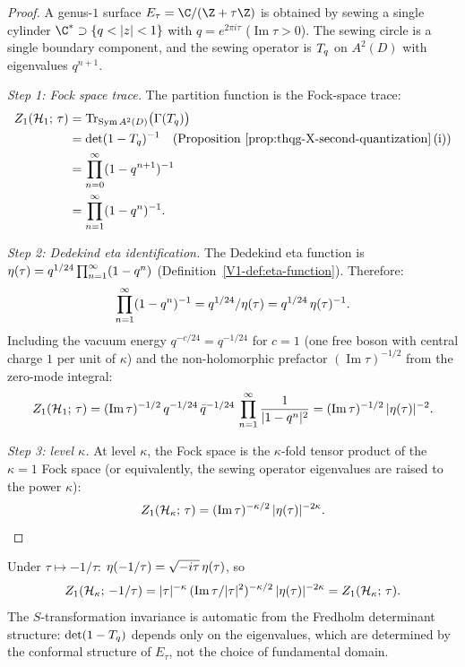 \begin{proof}
A genus-$1$ surface $E_\tau = \C/(\Z + \tau\Z)$ is obtained
by sewing a single cylinder $\C^* \supset
\{q < |z| < 1\}$ with $q = e^{2\pi i \tau}$ ($\operatorname{Im}\tau > 0$).
The sewing circle is a single boundary component, and the
sewing operator is $T_q$ on $A^2(D)$ with eigenvalues
$q^{n+1}$.

\emph{Step 1: Fock space trace.}
The partition function is the Fock-space trace:
\begin{align}
Z_1(\mathcal{H}_1;\,\tau)
&= \operatorname{Tr}_{\operatorname{Sym} A^2(D)}
\bigl(\Gamma(T_q)\bigr)
\notag\\
&= \det(1 - T_q)^{-1}
\quad\text{(Proposition~\ref{prop:thqg-X-second-quantization}\,(i))}
\notag\\
&= \prod_{n=0}^{\infty}
(1 - q^{n+1})^{-1}
\notag\\
&= \prod_{n=1}^{\infty}
(1 - q^n)^{-1}.
\end{align}

\emph{Step 2: Dedekind eta identification.}
The Dedekind eta function is
$\eta(\tau) = q^{1/24}\prod_{n=1}^{\infty}(1-q^n)$
(Definition~\ref{V1-def:eta-function}). Therefore:
\begin{equation}%
\prod_{n=1}^{\infty}(1-q^n)^{-1}
= q^{1/24} / \dedeta(\tau)
= q^{1/24}\,\dedeta(\tau)^{-1}.
\end{equation}
Including the vacuum energy $q^{-c/24} = q^{-1/24}$ for
$c = 1$ (one free boson with central charge $1$ per unit of
$\kappa$) and the non-holomorphic prefactor
$(\operatorname{Im}\tau)^{-1/2}$ from the zero-mode
integral:
\[
Z_1(\mathcal{H}_1;\,\tau)
= (\operatorname{Im}\tau)^{-1/2}\,
q^{-1/24}\,\bar{q}^{-1/24}\,
\prod_{n=1}^{\infty}
\frac{1}{|1-q^n|^2}
= (\operatorname{Im}\tau)^{-1/2}\,
|\eta(\tau)|^{-2}.
\]

\emph{Step 3: level $\kappa$.}
At level $\kappa$, the Fock space is the $\kappa$-fold tensor
product of the $\kappa = 1$ Fock space (or equivalently, the
sewing operator eigenvalues are raised to the power $\kappa$):
\[
Z_1(\mathcal{H}_\kappa;\,\tau)
= (\operatorname{Im}\tau)^{-\kappa/2}\,
|\eta(\tau)|^{-2\kappa}.
\qedhere
\]
\end{proof}

\begin{remark}%
Under $\tau \mapsto -1/\tau$:
$\eta(-1/\tau) = \sqrt{-i\tau}\,\eta(\tau)$, so
\[
Z_1(\mathcal{H}_\kappa;\,-1/\tau)
= |\tau|^{-\kappa}\,
(\operatorname{Im}\tau/|\tau|^2)^{-\kappa/2}\,
|\eta(\tau)|^{-2\kappa}
= Z_1(\mathcal{H}_\kappa;\,\tau).
\]
The $S$-transformation invariance is automatic from the
Fredholm determinant structure: $\det(1 - T_q)$ depends
only on the eigenvalues, which are determined by the conformal
structure of $E_\tau$, not the choice of fundamental domain.
\end{remark}

